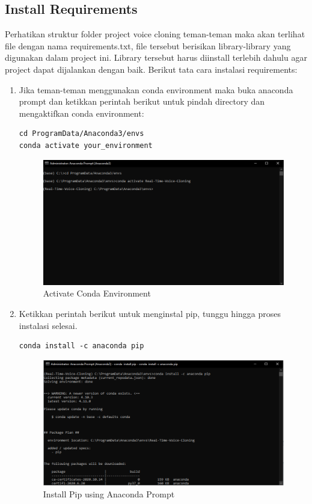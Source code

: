 \subsection{Install Requirements}
Perhatikan struktur folder project voice cloning teman-teman maka akan terlihat file dengan nama requirements.txt, file tersebut berisikan library-library yang digunakan dalam project ini. Library tersebut harus diinstall terlebih dahulu agar project dapat dijalankan dengan baik. Berikut tata cara instalasi requirements:
\begin{enumerate}
\item Jika teman-teman menggunakan conda environment maka buka anaconda prompt dan ketikkan perintah berikut untuk pindah directory dan mengaktifkan conda environment:
\begin{lstlisting}
cd ProgramData/Anaconda3/envs
conda activate your_environment
\end{lstlisting}

\begin{figure}[H]
\centering
\includegraphics[scale=.4]{figures/req4}
\caption{Activate Conda Environment}
\label{req4}
\end{figure}

\item Ketikkan perintah berikut untuk menginstal pip, tunggu hingga proses instalasi selesai.
\begin{lstlisting}
conda install -c anaconda pip
\end{lstlisting}

\begin{figure}[H]
\centering
\includegraphics[scale=.4]{figures/req5}
\caption{Install Pip using Anaconda Prompt}
\label{req5}
\end{figure}


\end{enumerate}

